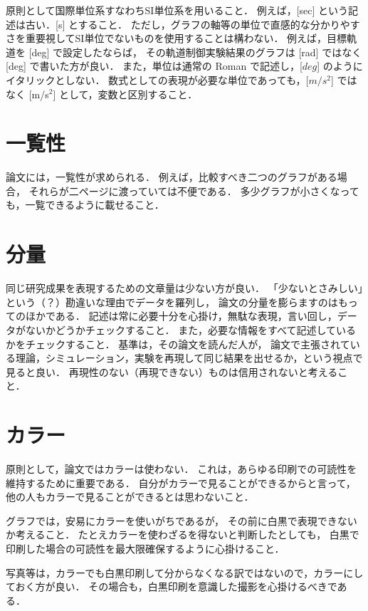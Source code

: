 原則として国際単位系すなわちSI単位系を用いること．
例えば，[sec] という記述は古い．[s] とすること．
ただし，グラフの軸等の単位で直感的な分かりやすさを重要視してSI単位でないものを使用することは構わない．
例えば，目標軌道を [deg] で設定したならば，
その軌道制御実験結果のグラフは [rad] ではなく [deg] で書いた方が良い．
また，単位は通常の Roman で記述し，[$deg$] のようにイタリックとしない．
数式としての表現が必要な単位であっても，[$m/s^2$] ではなく [m/s${}^2$] として，変数と区別すること．


\section{一覧性}

論文には，一覧性が求められる．
例えば，比較すべき二つのグラフがある場合，
それらが二ページに渡っていては不便である．
多少グラフが小さくなっても，一覧できるように載せること．


\section{分量}

同じ研究成果を表現するための文章量は少ない方が良い．
「少ないとさみしい」という（？）勘違いな理由でデータを羅列し，
論文の分量を膨らますのはもってのほかである．
記述は常に必要十分を心掛け，無駄な表現，言い回し，データがないかどうかチェックすること．
また，必要な情報をすべて記述しているかをチェックすること．
基準は，その論文を読んだ人が，
論文で主張されている理論，シミュレーション，実験を再現して同じ結果を出せるか，という視点で見ると良い．
再現性のない（再現できない）ものは信用されないと考えること．


\section{カラー}

原則として，論文ではカラーは使わない．
これは，あらゆる印刷での可読性を維持するために重要である．
自分がカラーで見ることができるからと言って，
他の人もカラーで見ることができるとは思わないこと．

グラフでは，安易にカラーを使いがちであるが，
その前に白黒で表現できないか考えること．
たとえカラーを使わざるを得ないと判断したとしても，
白黒で印刷した場合の可読性を最大限確保するように心掛けること．

写真等は，カラーでも白黒印刷して分からなくなる訳ではないので，カラーにしておく方が良い．
その場合も，白黒印刷を意識した撮影を心掛けるべきである．

